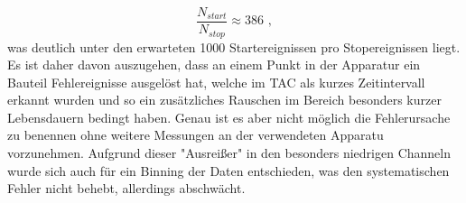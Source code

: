 \begin{equation}
    \frac{N_{start}}{N_{stop}} \approx 386 \, \, ,
\end{equation}
was deutlich unter den erwarteten 1000 Startereignissen pro Stopereignissen liegt. Es ist daher davon auszugehen, dass an einem Punkt in der Apparatur ein Bauteil Fehlereignisse ausgelöst hat, welche im TAC als kurzes Zeitintervall erkannt wurden und so ein zusätzliches Rauschen im Bereich besonders kurzer Lebensdauern bedingt haben. Genau ist es aber nicht möglich die Fehlerursache zu benennen ohne weitere Messungen an der verwendeten Apparatu vorzunehmen. Aufgrund dieser "Ausreißer" in den besonders niedrigen Channeln wurde sich auch für ein Binning der Daten entschieden, was den systematischen Fehler nicht behebt, allerdings abschwächt.

\newpage